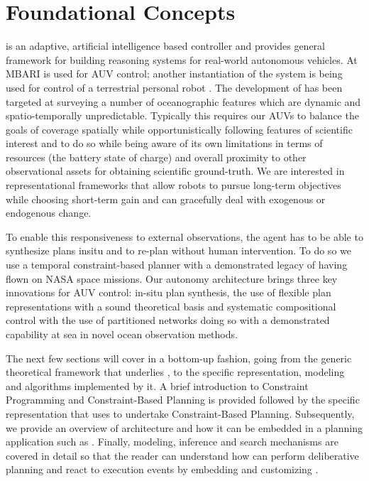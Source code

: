 \section{Foundational Concepts}
\label{sec:concepts}

\rx is an adaptive, artificial intelligence based controller and
provides general framework for building reasoning systems for
real-world autonomous vehicles. At MBARI \rx is used for AUV control;
another instantiation of the system is being used for control of a
terrestrial personal robot \cite{pr2, Meeussen:2010dn}. The
development of \rx has been targeted at surveying a number of
oceanographic features which are dynamic and spatio-temporally
unpredictable. Typically this requires our AUVs to balance the goals
of coverage spatially while opportunistically following features of
scientific interest and to do so while being aware of its own
limitations in terms of resources (\eg the battery state of charge)
and overall proximity to other observational assets for obtaining
scientific ground-truth. We are interested in representational
frameworks that allow robots to pursue long-term objectives while
choosing short-term gain and can gracefully deal with exogenous or
endogenous change.

To enable this responsiveness to external observations, the agent has
to be able to synthesize plans insitu and to re-plan without human
intervention. To do so we use a temporal constraint-based planner with
a demonstrated legacy of having flown on NASA space missions. Our
autonomy architecture brings three key innovations for AUV control:
in-situ plan synthesis, the use of flexible plan representations with
a sound theoretical basis and systematic compositional control with
the use of partitioned networks doing so with a demonstrated
capability at sea in novel ocean observation methods.

The next few sections will cover \eu in a bottom-up fashion, going
from the generic theoretical framework that underlies \eue, to the
specific representation, modeling and algorithms implemented by it.  A
brief introduction to Constraint Programming and Constraint-Based
Planning is provided followed by the specific representation that \eu
uses to undertake Constraint-Based Planning.  Subsequently, we provide
an overview of \eus architecture and how it can be embedded in a
planning application such as \rxe. Finally, \eus modeling, inference
and search mechanisms are covered in detail so that the reader can
understand how \rx can perform deliberative planning and react to
execution events by embedding and customizing \eu.

